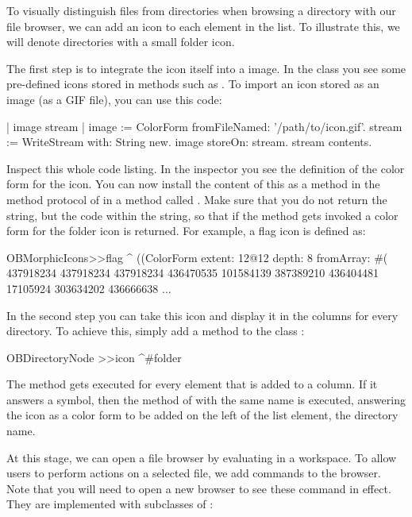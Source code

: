 \documentclass[a4paper,10pt,twoside]{book}
\begin{document}
To visually distinguish files from directories when browsing a directory with our file browser, we can add an icon to each element in the list. To illustrate this, we will denote directories with a small folder icon. 

The first step is to integrate the icon itself into a \pharo image. In the class  you see some pre-defined icons stored in methods such as . To import an icon stored as an image (\eg as a GIF file), you can use this code:

\begin{code}{}
| image stream |
image := ColorForm fromFileNamed: '/path/to/icon.gif'.
stream := WriteStream with: String new.
image storeOn: stream.
stream contents.
\end{code}

Inspect this whole code listing. In the inspector you see the definition of the color form for the icon. You can now install the content of this  as a method in the method protocol  of  in a method called . Make sure that you do not return the string, but the code within the string, so that if the method gets invoked a color form for the folder icon is returned. For example, a flag icon is defined as:

\begin{code}{}
OBMorphicIcons>>flag
	^ ((ColorForm
		extent: 12@12
		depth: 8
		fromArray: #( 437918234 437918234 437918234 436470535 101584139 387389210 436404481 17105924 303634202 436666638 ...
\end{code}

In the second step you can take this icon and display it in the columns for every directory. To achieve this, simply add a method  to the class :

\begin{code}{}
OBDirectoryNode >>icon
	^#folder
\end{code}

The method  gets executed for every element that is added to a column. If it answers a symbol, then the method of  with the same name is executed, answering the icon as a color form to be added on the left of the list element, \ie the directory name.

At this stage, we can open a file browser by evaluating  in a workspace. To allow users to perform actions on a selected file, we add commands to the browser. Note that you will need to open a new browser to see these command in effect. They are implemented with subclasses of :
\end{document}
